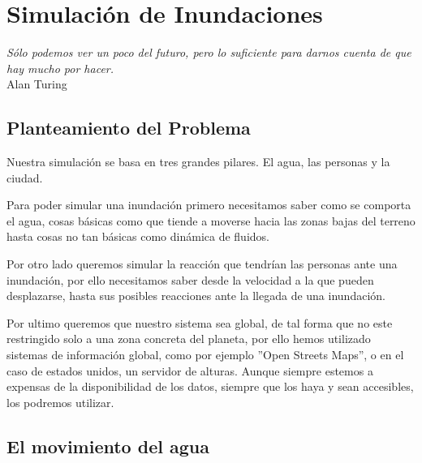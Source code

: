 
\chapter*{Simulación de Inundaciones} \label{cap2}

\begin{flushright}
\begin{minipage}{7.85cm}
    {\em Sólo podemos ver un poco del futuro, pero lo suficiente para darnos
    cuenta de que hay mucho por hacer.} \\  Alan Turing
\end{minipage}
\end{flushright}

\vspace*{5mm}

\section*{Planteamiento del Problema}

Nuestra simulación se basa en tres grandes pilares. El agua, las personas y la
ciudad. 

Para poder simular una inundación\cite{simulator} primero necesitamos saber
como se comporta el
agua, cosas básicas como que tiende a moverse hacia las zonas bajas del terreno
hasta cosas no tan básicas como dinámica de fluidos.

Por otro lado queremos simular la reacción que tendrían las personas ante una
inundación, por ello necesitamos saber desde la velocidad a la que pueden
desplazarse, hasta sus posibles reacciones ante la llegada de una inundación.

Por ultimo queremos que nuestro sistema sea global, de tal forma que no este
restringido solo a una zona concreta del planeta, por ello hemos utilizado
sistemas de información global, como por ejemplo ''Open Streets Maps'', o en
el caso de estados unidos, un servidor de alturas. Aunque siempre estemos a
expensas de la disponibilidad de los datos, siempre que los haya y sean
accesibles, los podremos utilizar.

\section*{El movimiento del agua}

